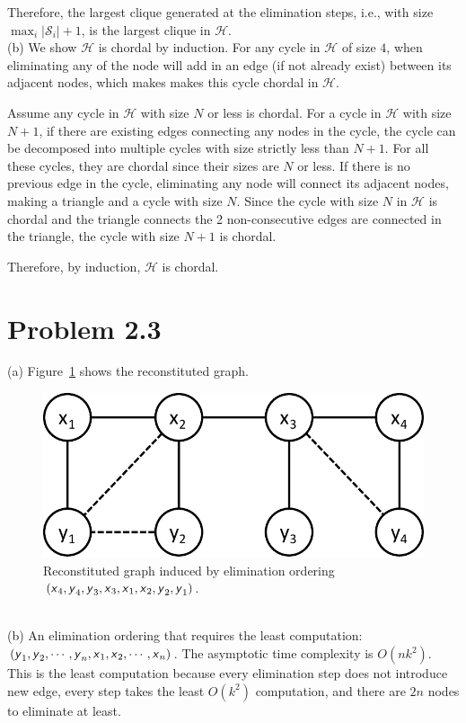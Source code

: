 \documentclass{article}
\newcommand{\s}[1]{\textsf{\textit{#1}}}
\newcommand{\qeds}{\hfill\qedsymbol}
\begin{document}
Therefore, the largest clique generated at the elimination steps, i.e., with size $\max_i |\mathscr{S}_i| +1$,
is the largest clique in $\mathscr{H}$. \qeds
\\

%
\noindent
(b) We show $\mathscr{H}$ is chordal by induction.
%
For any cycle in $\mathscr{H}$ of size $4$, when eliminating any of the node will add in an edge (if not already
exist) between its adjacent nodes, which makes makes this cycle chordal in $\mathscr{H}$.

%
Assume any cycle in $\mathscr{H}$ with size $N$ or less is chordal. For a cycle in $\mathscr{H}$ with size $N+1$,
if there are existing edges connecting any nodes in the cycle, the cycle can be decomposed into multiple cycles
with size strictly less than $N+1$. For all these cycles, they are chordal since their sizes are $N$ or less. If
there is no previous edge in the cycle, eliminating any node will connect its adjacent nodes, making a triangle
and a cycle with size $N$. Since the cycle with size $N$ in $\mathscr{H}$ is chordal and the triangle connects
the 2 non-consecutive edges are connected in the triangle, the cycle with size $N+1$ is chordal. 

%
Therefore, by induction, $\mathscr{H}$ is chordal. \qeds

\pagebreak

\section*{Problem 2.3}
(a) Figure~\ref{f:3a} shows the reconstituted graph.
%
\begin{figure}[h]
  \centering
  \includegraphics[width=0.4\columnwidth]{3a.pdf}
  \vspace{-0.2cm}
  \caption{Reconstituted graph induced by elimination ordering $(\s{x}_4,\s{y}_4,\s{y}_3,\s{x}_3,\s{x}_1,\s{x}_2,\s{y}_2,\s{y}_1)$.}
  \label{f:3a}
\end{figure}
%
\\

%
\noindent
(b) An elimination ordering that requires the least computation:
$(\s{y}_1, \s{y}_2, \cdots, \s{y}_n, \s{x}_1, \s{x}_2, \cdots, \s{x}_n)$.
%
The asymptotic time complexity is $O(nk^2)$.
%
This is the least computation because every elimination step does not introduce new edge, every step takes
the least $O(k^2)$ computation, and there are $2n$ nodes to eliminate at least.
\end{document}
